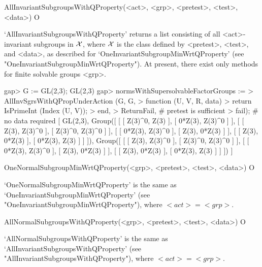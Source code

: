 \>AllInvariantSubgroupsWithQProperty(<act>, <grp>, <pretest>, <test>, <data>) O

`AllInvariantSubgroupsWithQProperty' returns a list consisting of all 
<act>-invariant subgroups in $\cal X$, where $\cal X$ is the class defined by <pretest>,
<test>, and <data>, as described for `OneInvariantSubgroupMinWrtQProperty' (see
"OneInvariantSubgroupMinWrtQProperty"). 
At present, there exist only methods for finite solvable groups <grp>.

\beginexample
gap> G := GL(2,3);
GL(2,3)
gap> normsWithSupersolvableFactorGroups :=
> AllInvSgrsWithQPropUnderAction (G, G, 
>    function (U, V, R, data)
>       return IsPrimeInt (Index (U, V));
>    end,
>    ReturnFail, # pretest is sufficient
>    fail); # no data required
[ GL(2,3), 
  Group([ [ [ Z(3)^0, Z(3) ], [ 0*Z(3), Z(3)^0 ] ], [ [ Z(3), Z(3)^0 ], 
          [ Z(3)^0, Z(3)^0 ] ], [ [ 0*Z(3), Z(3)^0 ], [ Z(3), 0*Z(3) ] ], 
      [ [ Z(3), 0*Z(3) ], [ 0*Z(3), Z(3) ] ] ]), 
  Group([ [ [ Z(3), Z(3)^0 ], [ Z(3)^0, Z(3)^0 ] ], 
      [ [ 0*Z(3), Z(3)^0 ], [ Z(3), 0*Z(3) ] ], 
      [ [ Z(3), 0*Z(3) ], [ 0*Z(3), Z(3) ] ] ]) ]
\endexample


\>OneNormalSubgroupMinWrtQProperty(<grp>, <pretest>, <test>, <data>) O

`OneNormalSubgroupMinWrtQProperty' is the same as 
`OneInvariantSubgroupMinWrtQProperty' (see
"OneInvariantSubgroupMinWrtQProperty"), where $<act> = <grp>$. 

\>AllNormalSubgroupsWithQProperty(<grp>, <pretest>, <test>, <data>) O

`AllNormalSubgroupsWithQProperty' is the same as 
`AllInvariantSubgroupsWithQProperty' (see
"AllInvariantSubgroupsWithQProperty"), where $<act> = <grp>$. 


